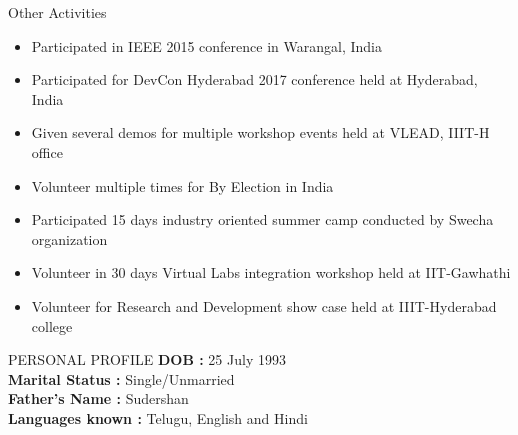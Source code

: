 \documentclass{resume} %
\begin{document}
\begin{rSection}{Other Activities}
\begin{itemize}
\item Participated in IEEE 2015 conference in Warangal, India
\item Participated for DevCon Hyderabad 2017 conference held
  at Hyderabad, India
\item Given several demos for multiple workshop events held
  at VLEAD, IIIT-H office
\item Volunteer multiple times for By Election in India
\item Participated 15 days industry oriented summer camp
  conducted by Swecha organization
\item Volunteer in 30 days Virtual Labs integration workshop
  held at IIT-Gawhathi
\item Volunteer for Research and Development show case held
  at IIIT-Hyderabad college
 
\end{itemize}
\end{rSection}


\begin{rSection}{PERSONAL PROFILE}
  \textbf {DOB :} 25 July 1993\\
  \textbf {Marital Status :} Single/Unmarried \\
  \textbf {Father's Name : } Sudershan \\
  \textbf {Languages known :} Telugu, English and Hindi \\

\end{rSection}
\end{document}
